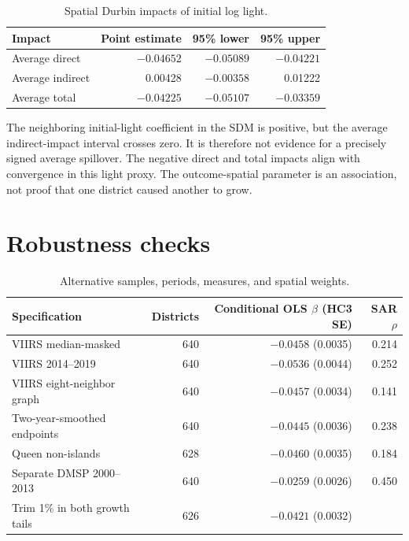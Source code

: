 \documentclass[11pt]{article}
\newcommand{\NA}{\textemdash}
\newcommand{\reportsection}[1]{\Needspace{8\baselineskip}\section{#1}}
\begin{document}
\begin{table}[H]
  \centering
  \caption{Spatial Durbin impacts of initial log light.}
  \begin{tabular}{@{}lrrr@{}}
    \toprule
    \textbf{Impact} & \textbf{Point estimate} & \textbf{95\% lower} & \textbf{95\% upper} \\
    \midrule
    Average direct & $-0.04652$ & $-0.05089$ & $-0.04221$ \\
    Average indirect & 0.00428 & $-0.00358$ & 0.01222 \\
    Average total & $-0.04225$ & $-0.05107$ & $-0.03359$ \\
    \bottomrule
  \end{tabular}
\end{table}

The neighboring initial-light coefficient in the SDM is positive, but the
average indirect-impact interval crosses zero. It is therefore not evidence
for a precisely signed average spillover. The negative direct and total
impacts align with convergence in this light proxy. The outcome-spatial
parameter is an association, not proof that one district caused another to
grow.

\reportsection{Robustness checks}

\begin{table}[H]
  \centering
  \caption{Alternative samples, periods, measures, and spatial weights.}
  \footnotesize
  \begin{tabularx}{\textwidth}{@{}Yrrr@{}}
    \toprule
    \textbf{Specification} & \textbf{Districts} &
    \textbf{Conditional OLS $\beta$ (HC3 SE)} & \textbf{SAR $\rho$} \\
    \midrule
    VIIRS median-masked & 640 & $-0.0458$ (0.0035) & 0.214 \\
    VIIRS 2014--2019 & 640 & $-0.0536$ (0.0044) & 0.252 \\
    VIIRS eight-neighbor graph & 640 & $-0.0457$ (0.0034) & 0.141 \\
    Two-year-smoothed endpoints & 640 & $-0.0445$ (0.0036) & 0.238 \\
    Queen non-islands & 628 & $-0.0460$ (0.0035) & 0.184 \\
    Separate DMSP 2000--2013 & 640 & $-0.0259$ (0.0026) & 0.450 \\
    Trim 1\% in both growth tails & 626 & $-0.0421$ (0.0032) & \NA \\
    \bottomrule
  \end{tabularx}
\end{table}
\end{document}
